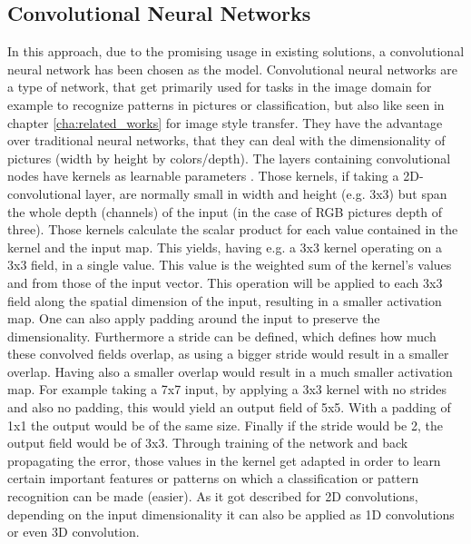 \subsection{Convolutional Neural Networks}
\label{subsec:app_conv}
In this approach, due to the promising usage in existing solutions, a convolutional neural network has been chosen as the model. Convolutional neural networks are a type of network, that get primarily used for tasks in the image domain for example to recognize patterns in pictures or classification, but also like seen in chapter \ref{cha:related_works} for image style transfer. They have the advantage over traditional neural networks, that they can deal with the dimensionality of pictures (width by height by colors/depth). The layers containing convolutional nodes have kernels as learnable parameters \cite{oshea2015introductionConv}. Those kernels, if taking a 2D-convolutional layer, are normally small in width and height (e.g. 3x3) but span the whole depth (channels) of the input (in the case of RGB pictures depth of three). Those kernels calculate the scalar product for each value contained in the kernel and the input map. This yields, having e.g. a 3x3 kernel operating on a 3x3 field, in a single value. This value is the weighted sum of the kernel's values and from those of the input vector. This operation will be applied to each 3x3 field along the spatial dimension of the input, resulting in a smaller activation map. One can also apply padding around the input to preserve the dimensionality. Furthermore a stride can be defined, which defines how much these convolved fields overlap, as using a bigger stride would result in a smaller overlap. Having also a smaller overlap would result in a much smaller activation map. 
For example taking a 7x7 input, by applying a 3x3 kernel with no strides and also no padding, this would yield an output field of 5x5. With a padding of 1x1 the output would be of the same size. Finally if the stride would be 2, the output field would be of 3x3.
Through training of the network and back propagating the error, those values in the kernel get adapted in order to learn certain important features or patterns on which a classification or pattern recognition can be made (easier). As it got described for 2D convolutions, depending on the input dimensionality it can also be applied as 1D convolutions or even 3D convolution. 


